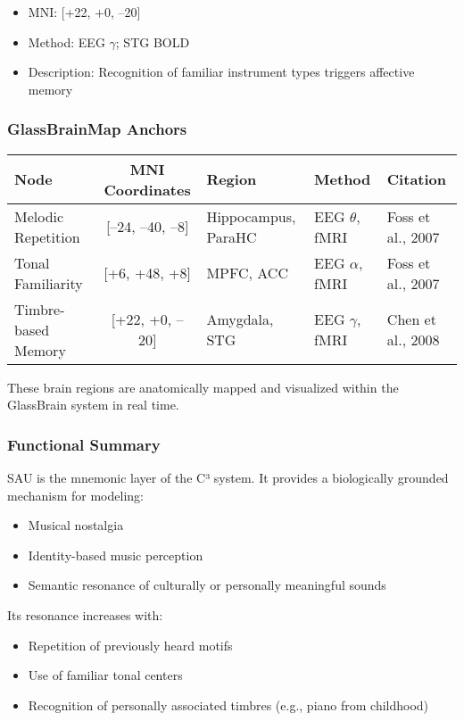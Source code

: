 \documentclass[10pt]{article}
\begin{document}
\begin{itemize}
    \item MNI: [+22, +0, –20]
    \item Method: EEG $\gamma$; STG BOLD
    \item Description: Recognition of familiar instrument types triggers affective memory
\end{itemize}

\subsubsection*{GlassBrainMap Anchors}

\begin{center}
\begin{tabular}{|l|c|l|l|l|}
\hline
\textbf{Node} & \textbf{MNI Coordinates} & \textbf{Region} & \textbf{Method} & \textbf{Citation} \\
\hline
Melodic Repetition & [–24, –40, –8] & Hippocampus, ParaHC & EEG $\theta$, fMRI & Foss et al., 2007 \\
Tonal Familiarity & [+6, +48, +8] & MPFC, ACC & EEG $\alpha$, fMRI & Foss et al., 2007 \\
Timbre-based Memory & [+22, +0, –20] & Amygdala, STG & EEG $\gamma$, fMRI & Chen et al., 2008 \\
\hline
\end{tabular}
\end{center}

These brain regions are anatomically mapped and visualized within the GlassBrain system in real time.

\subsubsection*{Functional Summary}

SAU is the mnemonic layer of the C³ system. It provides a biologically grounded mechanism for modeling:

\begin{itemize}
    \item Musical nostalgia
    \item Identity-based music perception
    \item Semantic resonance of culturally or personally meaningful sounds
\end{itemize}

Its resonance increases with:

\begin{itemize}
    \item Repetition of previously heard motifs
    \item Use of familiar tonal centers
    \item Recognition of personally associated timbres (e.g., piano from childhood)
\end{itemize}
\end{document}
